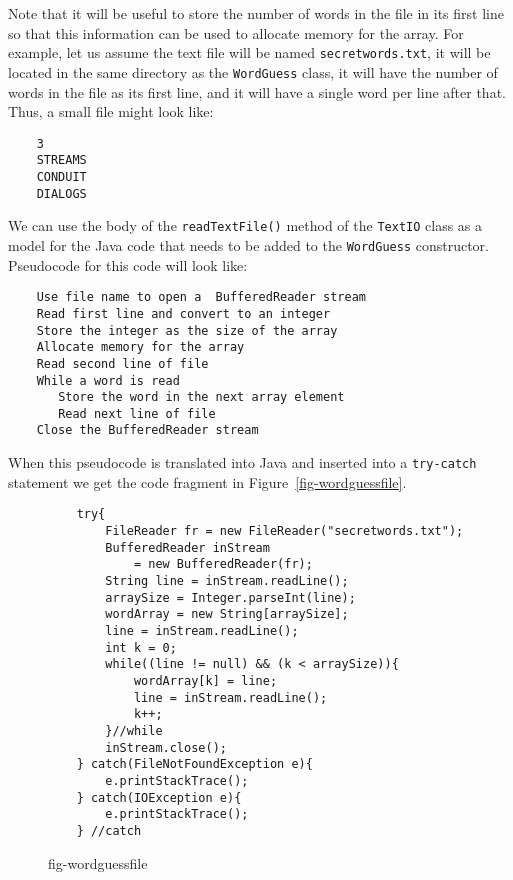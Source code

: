 \noindent Note that it will be useful to store the number of
words in the file in its first line so that this information can be 
used to allocate memory for the array.  For example, let us assume
the text file will be named {\tt secretwords.txt}, it will be located 
in the same directory as the {\tt WordGuess} class, it will have
the number of words in the file as its first line, and it will have
a single word per line after that.  Thus, a  small file 
might look like:
\begin{jjjlisting}
\begin{lstlisting}
    3
    STREAMS
    CONDUIT
    DIALOGS
\end{lstlisting}
\end{jjjlisting}

We can use the body of the {\tt readTextFile()} method of the {\tt TextIO} 
class as a model for the Java code that needs to be added to the {\tt WordGuess} 
constructor. Pseudocode for this code will look like:
\begin{jjjlisting}
\begin{lstlisting}
    Use file name to open a  BufferedReader stream
    Read first line and convert to an integer
    Store the integer as the size of the array 
    Allocate memory for the array
    Read second line of file
    While a word is read
       Store the word in the next array element
       Read next line of file
    Close the BufferedReader stream   
\end{lstlisting}
\end{jjjlisting}

\noindent When this pseudocode is translated into Java and inserted into a
{\tt try-catch} statement we get the code fragment in Figure~\ref{fig-wordguessfile}.
\begin{figure}[h!]
\jjjprogstart
\begin{jjjlisting}
\begin{lstlisting}
    try{
        FileReader fr = new FileReader("secretwords.txt");
        BufferedReader inStream
            = new BufferedReader(fr);
        String line = inStream.readLine();
        arraySize = Integer.parseInt(line);
        wordArray = new String[arraySize];
        line = inStream.readLine();
        int k = 0;
        while((line != null) && (k < arraySize)){
            wordArray[k] = line;
            line = inStream.readLine();
            k++;
        }//while
        inStream.close();
    } catch(FileNotFoundException e){
        e.printStackTrace();
    } catch(IOException e){
        e.printStackTrace();
    } //catch
\end{lstlisting}
\end{jjjlisting}
{fig-wordguessfile}
\end{figure}

